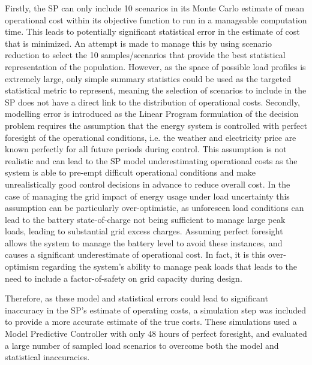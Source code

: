 \begin{subappendices}
    Firstly, the SP can only include 10 scenarios in its Monte Carlo estimate of mean operational cost within its objective function to run in a manageable computation time. This leads to potentially significant statistical error in the estimate of cost that is minimized. An attempt is made to manage this by using scenario reduction to select the 10 samples/scenarios that provide the best statistical representation of the population. However, as the space of possible load profiles is extremely large, only simple summary statistics could be used as the targeted statistical metric to represent, meaning the selection of scenarios to include in the SP does not have a direct link to the distribution of operational costs. Secondly, modelling error is introduced as the Linear Program formulation of the decision problem requires the assumption that the energy system is controlled with perfect foresight of the operational conditions, i.e. the weather and electricity price are known perfectly for all future periods during control. This assumption is not realistic and can lead to the SP model underestimating operational costs as the system is able to pre-empt difficult operational conditions and make unrealistically good control decisions in advance to reduce overall cost. In the case of managing the grid impact of energy usage under load uncertainty this assumption can be particularly over-optimistic, as unforeseen load conditions can lead to the battery state-of-charge not being sufficient to manage large peak loads, leading to substantial grid excess charges. Assuming perfect foresight allows the system to manage the battery level to avoid these instances, and causes a significant underestimate of operational cost. In fact, it is this over-optimism regarding the system's ability to manage peak loads that leads to the need to include a factor-of-safety on grid capacity during design.

    Therefore, as these model and statistical errors could lead to significant inaccuracy in the SP's estimate of operating costs, a simulation step was included to provide a more accurate estimate of the true costs. These simulations used a Model Predictive Controller with only 48 hours of perfect foresight\footnotemark, and evaluated a large number of sampled load scenarios to overcome both the model and statistical inaccuracies.


\end{subappendices}
